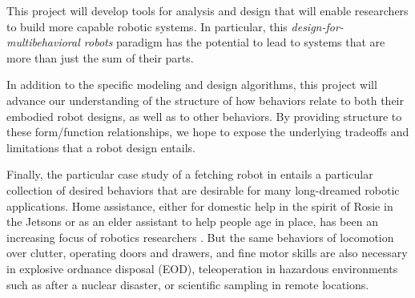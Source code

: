 \documentclass[11pt]{article}
\begin{document}


This project will develop tools for analysis and design that will enable researchers to build more capable robotic systems. In particular, this \emph{design-for-multibehavioral robots} paradigm has the potential to lead to systems that are more than just the sum of their parts.  

In addition to the specific modeling and design algorithms, this project will advance our understanding of the structure of how behaviors relate to both their embodied robot designs, as well as to other behaviors. By providing structure to these form/function relationships, we hope to expose the underlying tradeoffs and limitations that a robot design entails. 

Finally, the particular case study of a fetching robot in  entails a particular collection of desired behaviors that are desirable for many long-dreamed robotic applications. Home assistance, either for domestic help in the spirit of Rosie in the Jetsons or as an elder assistant to help people age in place, has been an increasing focus of robotics researchers \cite{something}. But the same behaviors of locomotion over clutter, operating doors and drawers, and fine motor skills are also necessary in explosive ordnance disposal (EOD), teleoperation in hazardous environments such as after a nuclear disaster, or scientific sampling in remote locations. 
\end{document}
